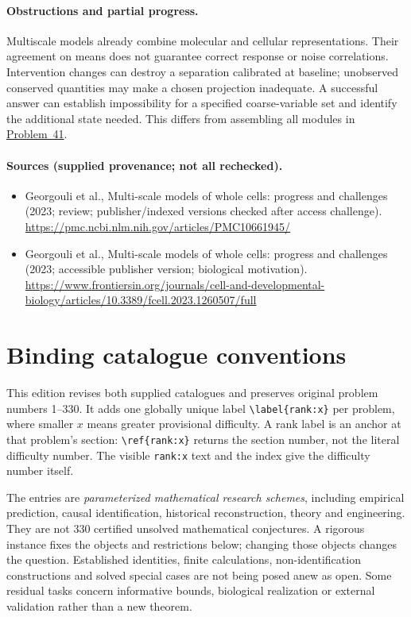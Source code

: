 \documentclass[11pt]{article}
\begin{document}
\paragraph{Obstructions and partial progress.} Multiscale models already combine molecular and cellular representations. Their agreement on means does not guarantee correct response or noise correlations. Intervention changes can destroy a separation calibrated at baseline; unobserved conserved quantities may make a chosen projection inadequate. A successful answer can establish impossibility for a specified coarse-variable set and identify the additional state needed. This differs from assembling all modules in \href{https://we-solve.github.io/problems/predictive-whole-cell-modelling-fd60530f/}{Problem~41}.
\paragraph{Sources (supplied provenance; not all rechecked).}
\begin{itemize}
\item Georgouli et al., Multi-scale models of whole cells: progress and challenges (2023; review; publisher/indexed versions checked after access challenge). \url{https://pmc.ncbi.nlm.nih.gov/articles/PMC10661945/}
\item Georgouli et al., Multi-scale models of whole cells: progress and challenges (2023; accessible publisher version; biological motivation). \url{https://www.frontiersin.org/journals/cell-and-developmental-biology/articles/10.3389/fcell.2023.1260507/full}
\end{itemize}


\section*{Binding catalogue conventions}
This edition revises both supplied catalogues and preserves original problem numbers 1--330. It adds one globally unique label \verb|\label{rank:x}| per problem, where smaller $x$ means greater provisional difficulty. A rank label is an anchor at that problem's section: \verb|\ref{rank:x}| returns the section number, not the literal difficulty number. The visible \texttt{rank:x} text and the index give the difficulty number itself.

The entries are \emph{parameterized mathematical research schemes}, including empirical prediction, causal identification, historical reconstruction, theory and engineering. They are not 330 certified unsolved mathematical conjectures. A rigorous instance fixes the objects and restrictions below; changing those objects changes the question. Established identities, finite calculations, non-identification constructions and solved special cases are not being posed anew as open. Some residual tasks concern informative bounds, biological realization or external validation rather than a new theorem.
\end{document}
